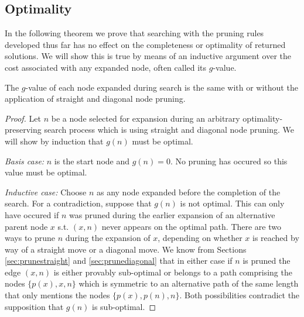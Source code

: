 \subsection{Optimality}
In the following theorem we prove that searching with the pruning rules
developed thus far has no effect on the completeness or optimality of returned 
solutions. We will show this is true by means of an inductive
argument over the cost associated with any expanded node, often called its 
$g$-value. 

\begin{theorem}
The $g$-value of each node expanded during search is the same 
with or without the application of straight and diagonal node pruning.
\end{theorem}
\begin{proof}
Let $n$ be a node selected for expansion during an arbitrary
optimality-preserving search process which is using straight and diagonal
node pruning. We will show by induction that $g(n)$ must be optimal.
\par
\emph{Basis case: } $n$ is the start node and $g(n) = 0$. No pruning has
occured so this value must be optimal.
\par
\emph{Inductive case: }
Choose $n$ as any node expanded before the completion
of the search. For a contradiction, suppose that $g(n)$ is not optimal.
This can only have occured if $n$ was pruned during the earlier 
expansion of an alternative parent node $x$ s.t. $(x, n)$ never appears on 
the optimal path.
There are two ways to prune $n$ during the expansion of $x$, depending on whether 
$x$ is reached by way of a straight move or a diagonal move.
We know from Sections \ref{sec:prunestraight} and \ref{sec:prunediagonal} 
that in either case if $n$ is pruned the edge $(x, n)$ is either provably
sub-optimal or belongs to a path comprising the nodes 
$\lbrace p(x), x, n \rbrace$ which is symmetric to an alternative path of the same 
length that only mentions the nodes $\lbrace p(x), p(n), n\rbrace$.
Both possibilities contradict the supposition that $g(n)$ is sub-optimal. 
\end{proof}

